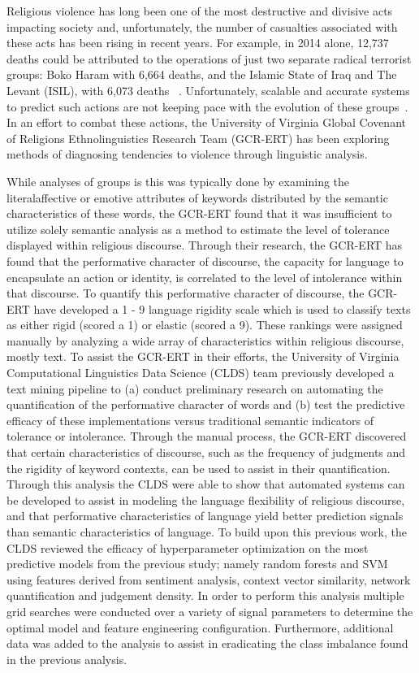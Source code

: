 \documentclass[11pt]{article}
\begin{document}
Religious violence has long been one of the most destructive and divisive acts impacting society and, unfortunately, the number of casualties associated with these acts has been rising in recent years. For example, in 2014 alone, 12,737 deaths could be attributed to the operations of just two separate radical terrorist groups: Boko Haram with 6,664 deaths, and the Islamic State of Iraq and The Levant (ISIL), with 6,073 deaths ~\cite{Searcey2015}. Unfortunately, scalable and accurate systems to predict such actions are not keeping pace with the evolution of these groups~\cite{Yang2010}. In an effort to combat these actions, the University of Virginia Global Covenant of Religions Ethnolinguistics Research Team (GCR-ERT) has been exploring methods of diagnosing tendencies to violence through linguistic analysis.

While analyses of groups is this was typically done by examining the literalaffective or emotive attributes of keywords distributed by the semantic characteristics of these words, the GCR-ERT found that it was insufficient to utilize solely semantic analysis as a method to estimate the level of tolerance displayed within religious discourse. Through their research, the GCR-ERT has found that the performative character of discourse, the capacity for language to encapsulate an action or identity, is correlated to the level of intolerance within that discourse. To quantify this performative character of discourse, the GCR-ERT have developed a 1 - 9 language rigidity scale which is used to classify texts as either rigid (scored a 1) or elastic (scored a 9). These rankings were assigned manually by analyzing a wide array of characteristics within religious discourse, mostly text. To assist the GCR-ERT in their efforts, the University of Virginia Computational Linguistics Data Science (CLDS) team previously developed a text mining pipeline to (a) conduct preliminary research on automating the quantification of the performative character of words and (b) test the predictive efficacy of these implementations versus traditional semantic indicators of tolerance or intolerance. Through the manual process, the GCR-ERT discovered that certain characteristics of discourse, such as the frequency of judgments and the rigidity of keyword contexts, can be used to assist in their quantification. Through this analysis the CLDS were able to show that automated systems can be developed to assist in modeling the language flexibility of religious discourse, and that performative characteristics of language yield better prediction signals than semantic characteristics of language.
To build upon this previous work, the CLDS reviewed the efficacy of hyperparameter optimization on the most predictive models from the previous study; namely random forests and SVM using features derived from sentiment analysis, context vector similarity, network quantification and judgement density. In order to perform this analysis multiple grid searches were conducted over a variety of signal parameters to determine the optimal model and feature engineering configuration. Furthermore, additional data was added to the analysis to assist in eradicating the class imbalance found in the previous analysis.
\end{document}
